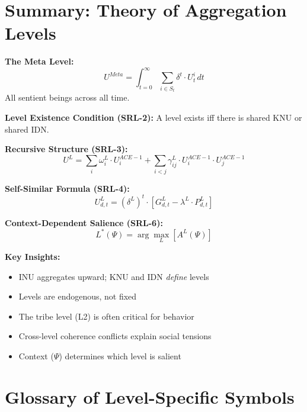 \section{Summary: Theory of Aggregation Levels}
\label{sec:aaa-summary}

\begin{tcolorbox}[colback=gray!5!white, colframe=gray!75!black, title=Appendix WHO Summary]

\textbf{The Meta Level:}
$$U^{Meta} = \int_{t=0}^{\infty} \sum_{i \in S_t} \delta^t \cdot U^i_t \, dt$$
All sentient beings across all time.

\textbf{Level Existence Condition (SRL-2):}
A level exists iff there is shared KNU or shared IDN.

\textbf{Recursive Structure (SRL-3):}
$$U^L = \sum_i \omega^L_i \cdot U^{ACE-1}_i + \sum_{i<j} \gamma^L_{ij} \cdot U^{ACE-1}_i \cdot U^{ACE-1}_j$$

\textbf{Self-Similar Formula (SRL-4):}
$$U^L_{d,t} = (\delta^L)^t \cdot [G^L_{d,t} - \lambda^L \cdot P^L_{d,t}]$$

\textbf{Context-Dependent Salience (SRL-6):}
$$L^*(\Psi) = \arg\max_L [A^L(\Psi)]$$

\textbf{Key Insights:}
\begin{itemize}
\item INU aggregates upward; KNU and IDN \emph{define} levels
\item Levels are endogenous, not fixed
\item The tribe level (L2) is often critical for behavior
\item Cross-level coherence conflicts explain social tensions
\item Context ($\Psi$) determines which level is salient
\end{itemize}

\end{tcolorbox}

\section{Glossary of Level-Specific Symbols}
\label{sec:aaa-glossary}

